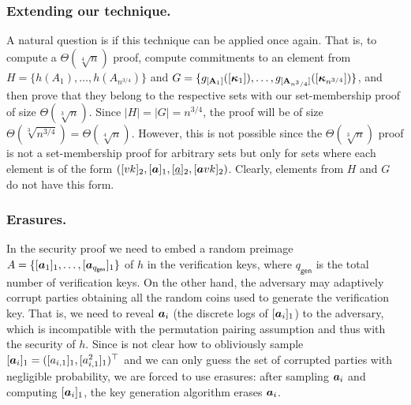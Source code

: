 
\subsubsection{Extending our technique.}
A natural question is if this technique can be applied once again. That is, to compute a $\Theta(\sqrt[4]{n})$  proof, compute commitments to an element from $H=\{h(A_1),\ldots,h(A_{n^{3/4}})\}$ and
$G=\allowbreak\{
	g_{[\mathbf{{A}}_1]}
		([
			{\boldsymbol{\kappa}}_1]),
	\ldots,\allowbreak
	g_{[\mathbf{{A}}_{n^3/4}]}
		([
			{\boldsymbol{\kappa}}_{n^{3/4}}
])\}$,
and then prove that they belong to the respective sets with our set-membership proof of size $\Theta(\sqrt[3]{n})$. Since $|H|=|G|=n^{3/4}$, the proof will be of size $\Theta(\sqrt[3]{n^{3/4}})=\Theta(\sqrt[4]{n})$. However, this is not possible since the $\Theta(\sqrt[3]{n})$ proof is not a set-membership proof for arbitrary sets but only for sets where each element is of the form $([vk]_2,[{\boldsymbol{a}}]_1,[\underline{a}]_2,[{\boldsymbol{a}}vk]_2)$. Clearly, elements from $H$ and $G$ do not have this form.


\subsubsection{Erasures.}
In the security proof we need to embed a random preimage $A=\{[{\boldsymbol{a}}_1]_1,\ldots,\allowbreak [{\boldsymbol{a}}_{q_{\mathsf{gen}}}]_1\}$ of $h$ in the verification keys, where $q_{\mathsf{gen}}$ is the total number of verification keys. On the other hand, the adversary may adaptively corrupt parties obtaining all the random coins used to generate the verification key. That is, we need to reveal ${\boldsymbol{a}}_i$ (the discrete logs of $[{\boldsymbol{a}}_i]_1$) to the adversary, which is incompatible with the permutation pairing assumption and thus with the security of $h$. Since is not clear how to obliviously sample $[{\boldsymbol{a}}_i]_1=([a_{i,1}]_1,[a_{i,1}^2]_1)^\top$ and we can only guess the set of corrupted parties with negligible probability, we are forced to use erasures: after sampling ${\boldsymbol{a}}_i$ and computing $[{\boldsymbol{a}}_i]_1$, the key generation algorithm erases ${\boldsymbol{a}}_i$.


